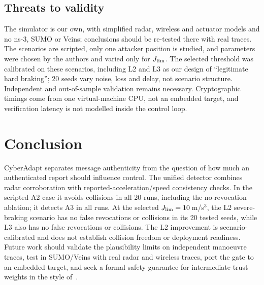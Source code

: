 \documentclass[journal]{IEEEtran}
\begin{document}
\subsection{Threats to validity}
The simulator is our own, with simplified radar, wireless and actuator models and no ns-3, SUMO or Veins; conclusions should be re-tested there with real traces. The scenarios are scripted, only one attacker position is studied, and parameters were chosen by the authors and varied only for $J_{\rm lim}$. The selected threshold was calibrated on these scenarios, including L2 and L3 as our design of ``legitimate hard braking''; 20 seeds vary noise, loss and delay, not scenario structure. Independent and out-of-sample validation remains necessary. Cryptographic timings come from one virtual-machine CPU, not an embedded target, and verification latency is not modelled inside the control loop.

\section{Conclusion}
CyberAdapt separates message authenticity from the question of how much an authenticated report should influence control. The unified detector combines radar corroboration with reported-acceleration/speed consistency checks. In the scripted A2 case it avoids collisions in all 20 runs, including the no-revocation ablation; it detects A3 in all runs. At the selected $J_{\rm lim}=10$\,m/s$^3$, the L2 severe-braking scenario has no false revocations or collisions in its 20 tested seeds, while L3 also has no false revocations or collisions. The L2 improvement is scenario-calibrated and does not establish collision freedom or deployment readiness. Future work should validate the plausibility limits on independent manoeuvre traces, test in SUMO/Veins with real radar and wireless traces, port the gate to an embedded target, and seek a formal safety guarantee for intermediate trust weights in the style of~\cite{lyons2026}.
\end{document}
